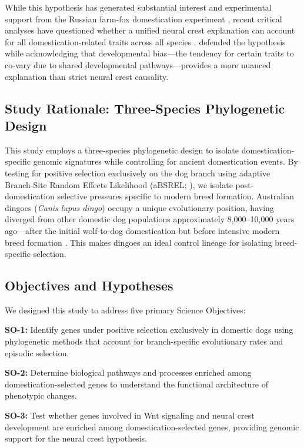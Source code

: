 \documentclass[11pt,letterpaper]{article}
\begin{document}
While this hypothesis has generated substantial interest and experimental support from the Russian farm-fox domestication experiment \citep{Kukekova2018, Trut2009}, recent critical analyses have questioned whether a unified neural crest explanation can account for all domestication-related traits across all species \citep{SanchezVillagra2021}. \citet{Wilkins2020} defended the hypothesis while acknowledging that developmental bias---the tendency for certain traits to co-vary due to shared developmental pathways---provides a more nuanced explanation than strict neural crest causality.

\subsection{Study Rationale: Three-Species Phylogenetic Design}

This study employs a three-species phylogenetic design to isolate domestication-specific genomic signatures while controlling for ancient domestication events. By testing for positive selection exclusively on the dog branch using adaptive Branch-Site Random Effects Likelihood (aBSREL; \citet{Smith2015}), we isolate post-domestication selective pressures specific to modern breed formation. Australian dingoes (\textit{Canis lupus dingo}) occupy a unique evolutionary position, having diverged from other domestic dog populations approximately 8,000--10,000 years ago---after the initial wolf-to-dog domestication but before intensive modern breed formation \citep{Cairns2022, Souilmi2024}. This makes dingoes an ideal control lineage for isolating breed-specific selection.

\subsection{Objectives and Hypotheses}

We designed this study to address five primary Science Objectives:

\textbf{SO-1:} Identify genes under positive selection exclusively in domestic dogs using phylogenetic methods that account for branch-specific evolutionary rates and episodic selection.

\textbf{SO-2:} Determine biological pathways and processes enriched among domestication-selected genes to understand the functional architecture of phenotypic changes.

\textbf{SO-3:} Test whether genes involved in Wnt signaling and neural crest development are enriched among domestication-selected genes, providing genomic support for the neural crest hypothesis.
\end{document}
